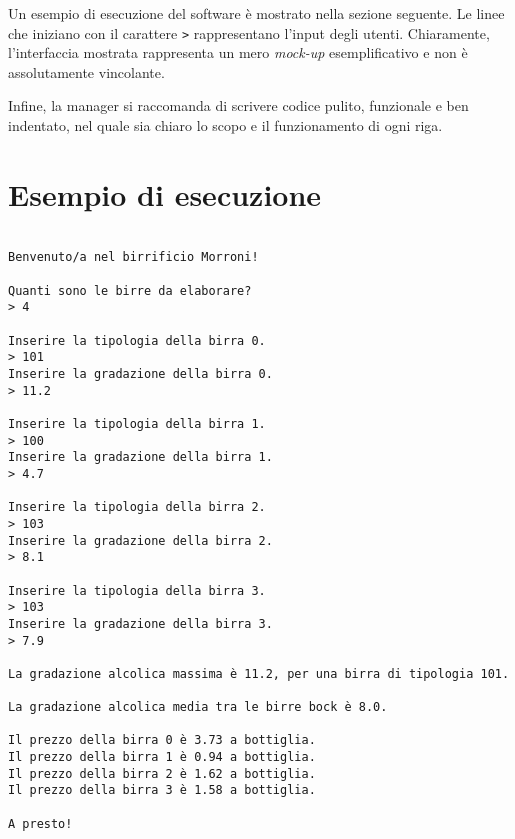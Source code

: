 \documentclass[a4paper, 11pt]{exam}
\begin{document}
Un esempio di esecuzione del software è mostrato nella sezione seguente. 
Le linee che iniziano con il carattere \texttt{>} rappresentano l'input degli utenti.
Chiaramente, l'interfaccia mostrata rappresenta un mero \textit{mock-up} esemplificativo e non è assolutamente vincolante. 

Infine, la manager si raccomanda di scrivere codice pulito, funzionale e ben indentato, nel quale sia chiaro lo scopo e il funzionamento di ogni riga.
\pagebreak
\maketitle
\section*{Esempio di esecuzione}

\begin{verbatim}

Benvenuto/a nel birrificio Morroni! 

Quanti sono le birre da elaborare?
> 4

Inserire la tipologia della birra 0.
> 101
Inserire la gradazione della birra 0.
> 11.2

Inserire la tipologia della birra 1.
> 100
Inserire la gradazione della birra 1.
> 4.7

Inserire la tipologia della birra 2.
> 103
Inserire la gradazione della birra 2.
> 8.1

Inserire la tipologia della birra 3.
> 103
Inserire la gradazione della birra 3.
> 7.9

La gradazione alcolica massima è 11.2, per una birra di tipologia 101.

La gradazione alcolica media tra le birre bock è 8.0.

Il prezzo della birra 0 è 3.73 a bottiglia.
Il prezzo della birra 1 è 0.94 a bottiglia.
Il prezzo della birra 2 è 1.62 a bottiglia.
Il prezzo della birra 3 è 1.58 a bottiglia.

A presto!
\end{verbatim}
\end{document}
